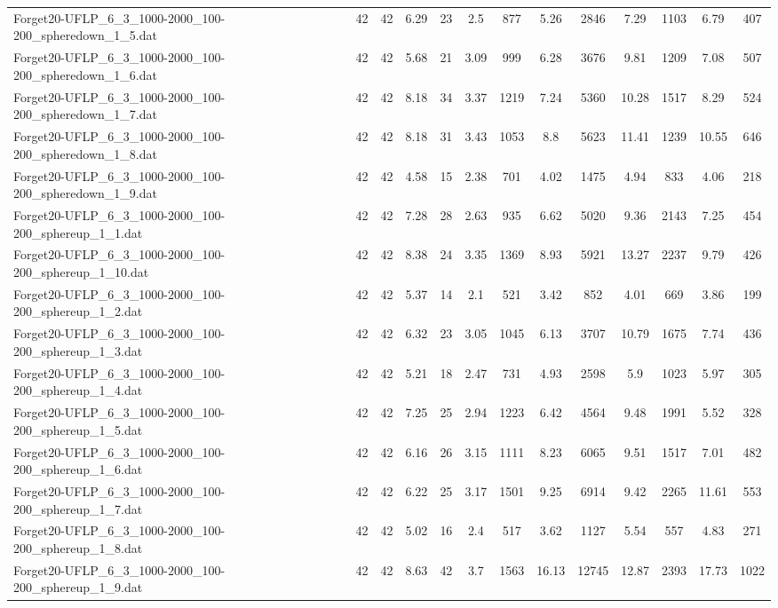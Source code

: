 \begin{table}[!ht]
{\begin{tabular}{lcccccccccccc}
Forget20-UFLP\_6\_3\_1000-2000\_100-200\_spheredown\_1\_5.dat & 42 & 42 & 6.29 & 23 & 2.5 & 877 & 5.26 & 2846 & 7.29 & 1103 & 6.79 & 407 \\
Forget20-UFLP\_6\_3\_1000-2000\_100-200\_spheredown\_1\_6.dat & 42 & 42 & 5.68 & 21 & 3.09 & 999 & 6.28 & 3676 & 9.81 & 1209 & 7.08 & 507 \\
Forget20-UFLP\_6\_3\_1000-2000\_100-200\_spheredown\_1\_7.dat & 42 & 42 & 8.18 & 34 & 3.37 & 1219 & 7.24 & 5360 & 10.28 & 1517 & 8.29 & 524 \\
Forget20-UFLP\_6\_3\_1000-2000\_100-200\_spheredown\_1\_8.dat & 42 & 42 & 8.18 & 31 & 3.43 & 1053 & 8.8 & 5623 & 11.41 & 1239 & 10.55 & 646 \\
Forget20-UFLP\_6\_3\_1000-2000\_100-200\_spheredown\_1\_9.dat & 42 & 42 & 4.58 & 15 & 2.38 & 701 & 4.02 & 1475 & 4.94 & 833 & 4.06 & 218 \\
Forget20-UFLP\_6\_3\_1000-2000\_100-200\_sphereup\_1\_1.dat & 42 & 42 & 7.28 & 28 & 2.63 & 935 & 6.62 & 5020 & 9.36 & 2143 & 7.25 & 454 \\
Forget20-UFLP\_6\_3\_1000-2000\_100-200\_sphereup\_1\_10.dat & 42 & 42 & 8.38 & 24 & 3.35 & 1369 & 8.93 & 5921 & 13.27 & 2237 & 9.79 & 426 \\
Forget20-UFLP\_6\_3\_1000-2000\_100-200\_sphereup\_1\_2.dat & 42 & 42 & 5.37 & 14 & 2.1 & 521 & 3.42 & 852 & 4.01 & 669 & 3.86 & 199 \\
Forget20-UFLP\_6\_3\_1000-2000\_100-200\_sphereup\_1\_3.dat & 42 & 42 & 6.32 & 23 & 3.05 & 1045 & 6.13 & 3707 & 10.79 & 1675 & 7.74 & 436 \\
Forget20-UFLP\_6\_3\_1000-2000\_100-200\_sphereup\_1\_4.dat & 42 & 42 & 5.21 & 18 & 2.47 & 731 & 4.93 & 2598 & 5.9 & 1023 & 5.97 & 305 \\
Forget20-UFLP\_6\_3\_1000-2000\_100-200\_sphereup\_1\_5.dat & 42 & 42 & 7.25 & 25 & 2.94 & 1223 & 6.42 & 4564 & 9.48 & 1991 & 5.52 & 328 \\
Forget20-UFLP\_6\_3\_1000-2000\_100-200\_sphereup\_1\_6.dat & 42 & 42 & 6.16 & 26 & 3.15 & 1111 & 8.23 & 6065 & 9.51 & 1517 & 7.01 & 482 \\
Forget20-UFLP\_6\_3\_1000-2000\_100-200\_sphereup\_1\_7.dat & 42 & 42 & 6.22 & 25 & 3.17 & 1501 & 9.25 & 6914 & 9.42 & 2265 & 11.61 & 553 \\
Forget20-UFLP\_6\_3\_1000-2000\_100-200\_sphereup\_1\_8.dat & 42 & 42 & 5.02 & 16 & 2.4 & 517 & 3.62 & 1127 & 5.54 & 557 & 4.83 & 271 \\
Forget20-UFLP\_6\_3\_1000-2000\_100-200\_sphereup\_1\_9.dat & 42 & 42 & 8.63 & 42 & 3.7 & 1563 & 16.13 & 12745 & 12.87 & 2393 & 17.73 & 1022 \\

\end{tabular}}
\end{table}
